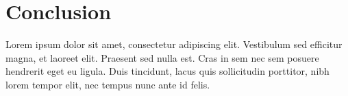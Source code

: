 \chapter{Conclusion}
\label{sec:conclusion}

Lorem ipsum dolor sit amet, consectetur adipiscing elit. Vestibulum sed efficitur magna, et laoreet elit. Praesent sed nulla est. Cras in sem nec sem posuere hendrerit eget eu ligula. Duis tincidunt, lacus quis sollicitudin porttitor, nibh lorem tempor elit, nec tempus nunc ante id felis.
